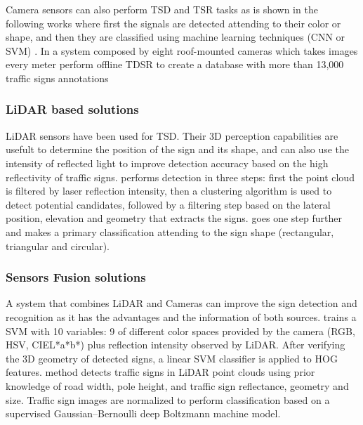Camera sensors can also perform TSD and TSR tasks as is 
shown in the following works where first the signals are detected attending to
their color or shape, and then they are classified using machine learning techniques (CNN or SVM)
\cite{miyata2017automatic, yang2016towards, wali2015automatic}. In \cite{timofte2014multi}
a system composed by eight roof-mounted cameras which takes images every meter
perform offline TDSR to create a database with more than 13,000 traffic signs annotations


\subsubsection{LiDAR based solutions}
LiDAR sensors have been used for TSD. Their 3D perception capabilities are 
usefult to determine the position of the sign and its shape, and can also use 
the intensity of reflected light to improve detection accuracy based on the
high reflectivity of traffic signs. \cite{gargoum2017automated} 
performs detection in three steps: first the point cloud is filtered by 
laser reflection intensity, then a clustering algorithm is used to detect 
potential candidates, followed by a filtering step based on the lateral 
position, elevation and geometry that extracts the signs. 
\cite{weng2016road} goes one step further and makes a primary 
classification attending to the sign shape (rectangular, triangular and 
circular).

\subsubsection{Sensors Fusion solutions}
A system that combines LiDAR and Cameras can improve the sign detection and 
recognition as it has the advantages and the information of both sources. 
\cite{zhou2014lidar} trains a SVM with 10 variables: 9 of different color 
spaces provided by the camera (RGB, HSV, CIEL*a*b*) plus reflection intensity 
observed by LiDAR. After verifying the 3D geometry of detected signs, a linear
SVM classifier is applied to HOG features.
\cite{guan2018robust} method detects traffic signs in LiDAR point clouds
using prior knowledge of road width, pole height, and traffic sign reflectance, 
geometry and size. Traffic sign images are normalized to perform classification 
based on a supervised Gaussian–Bernoulli deep Boltzmann machine model.


